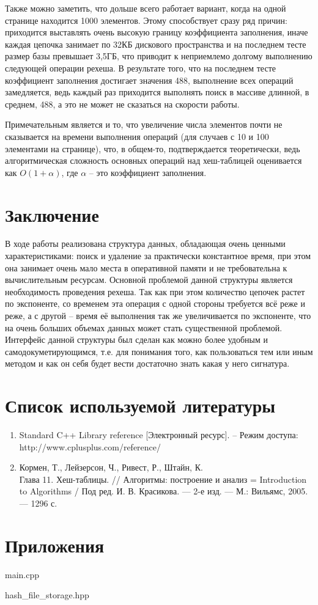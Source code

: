 \documentclass[12pt, a4paper]{fallen_report}
\begin{document}
Также можно заметить, что дольше всего работает вариант, когда на одной странице находится 1000 элементов. Этому способствует сразу ряд причин: приходится выставлять очень высокую границу коэффициента заполнения, иначе каждая цепочка занимает по 32КБ дискового пространства и на последнем тесте размер базы превышает 3,5ГБ, что приводит к неприемлемо долгому выполнению следующей операции рехеша. В результате того, что на последнем тесте коэффициент заполнения достигает значения 488, выполнение всех операций замедляется, ведь каждый раз приходится выполнять поиск в массиве длинной, в среднем, 488, а это не может не сказаться на скорости работы.

Примечательным является и то, что увеличение числа элементов почти не сказывается на времени выполнения операций (для случаев с 10 и 100 элементами на странице), что, в общем-то, подтверждается теоретически, ведь алгоритмическая сложность основных операций над хеш-таблицей оценивается как $O(1+\alpha)$, где $\alpha$ – это коэффициент заполнения.
\pagebreak
\section{Заключение}
В ходе работы реализована структура данных, обладающая очень ценными характеристиками: поиск и удаление за практически константное время, при этом она занимает очень мало места в оперативной памяти и не требовательна к вычислительным ресурсам. Основной проблемой данной структуры является необходимость проведения рехеша. Так как при этом количество цепочек растет по экспоненте, со временем эта операция с одной стороны требуется всё реже и реже, а с другой – время её выполнения так же увеличивается по экспоненте, что на очень больших объемах данных может стать существенной проблемой. Интерфейс данной структуры был сделан как можно более удобным и самодокуметирующимся, т.е. для понимания того, как пользоваться тем или иным методом и как он себя будет вести достаточно знать какая у него сигнатура.

\pagebreak
\section{Список используемой литературы}
\begin{enumerate}
\item Standard C++ Library reference [Электронный ресурс]. – Режим доступа:\\ http://www.cplusplus.com/reference/

\item Кормен, Т., Лейзерсон, Ч., Ривест, Р., Штайн, К. \\Глава 11. Хеш-таблицы. // Алгоритмы: построение и анализ = Introduction to Algorithms / Под ред. И. В. Красикова. — 2-е изд. — М.: Вильямс, 2005. — 1296 с.

\end{enumerate}

\pagebreak
\section*{Приложения}
{\consolas main.cpp}

{\consolas hash\_file\_storage.hpp}
\end{document}
